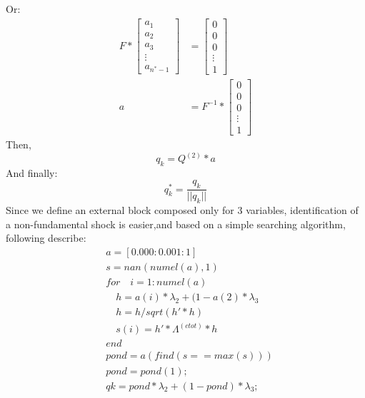 \documentclass[12pt, a4paper]{article}
\begin{document}
Or:
\begin{equation*}
\begin{aligned}
F * \left[\begin{matrix} a_1 \\ a_2 \\ a_3 \\ \vdots \\ a_{n^*-1} \end{matrix} \right] &=  \left[\begin{matrix} 0 \\ 0 \\ 0\\ \vdots \\ 1 \end{matrix} \right] \\
a &=  F^{-1} *\left[\begin{matrix} 0 \\ 0 \\ 0\\ \vdots \\ 1 \end{matrix} \right] 
\end{aligned}
\end{equation*}
Then,
\begin{equation*}
q_k = Q^{(2)}*a
\end{equation*}
And finally:
\begin{equation*}
q_k^* = \frac{q_k}{|| q_k ||}
\end{equation*}
Since we define an external block composed only for 3 variables, identification of a non-fundamental shock is easier,and based on a simple searching algorithm, following describe:
\begin{equation*}
\begin{aligned}
&a = [0.000 : 0.001: 1] \\
&s = nan(numel(a),1) \\
  & for \quad i  =  1:numel(a) \\
  & \quad h = a(i)* \lambda_2 + (1-a(2)*\lambda_3 \\
  & \quad h = h/sqrt(h'*h) \\
  & \quad s(i) = h'*\Lambda^{(ctot)}*h \\
  & end \\
&pond = a(find(s==max(s)))\\
&pond = pond(1); \\
&qk   = pond * \lambda_2 + (1-pond)* \lambda_3; 
\end{aligned}
\end{equation*}
\end{document}
